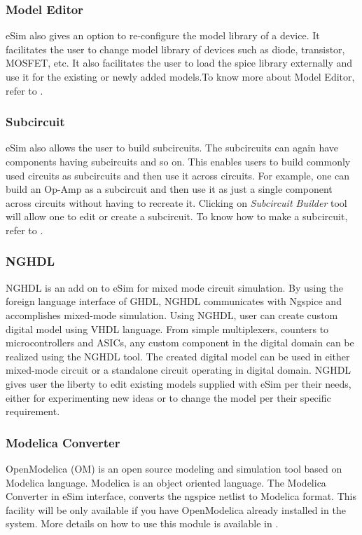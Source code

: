 \subsubsection {Model Editor}
eSim also gives an option to re-configure the model library of a
device. It facilitates the user to change model library of devices
such as diode, transistor, MOSFET, etc. It also facilitates the user to load the spice library externally and use it for the existing or newly added models.To know
more about Model Editor, refer to .

\subsubsection {Subcircuit}
eSim also allows the user to build subcircuits. The subcircuits can
again have components having subcircuits and so on. This enables users
to build commonly used circuits as subcircuits and then use it across
circuits. For example, one can build an Op-Amp as a
subcircuit and then use it as just a single component across circuits
without having to recreate it. Clicking on \textit{Subcircuit
Builder} tool will allow one to edit or create a subcircuit. To know
how to make a subcircuit, refer to .

\subsubsection {NGHDL}
NGHDL is an add on to eSim for mixed mode circuit simulation. By using the foreign language interface of GHDL, NGHDL communicates with Ngspice and accomplishes mixed-mode simulation. Using NGHDL, user can create custom digital model using VHDL language. From simple multiplexers, counters to microcontrollers and ASICs, any custom component in the digital domain can be realized using the NGHDL tool. The created digital model can be used in either mixed-mode circuit or a standalone circuit operating in digital domain. NGHDL gives user the liberty to edit existing models supplied with eSim per their needs, either for experimenting new ideas or to change the model per their specific requirement.

\subsubsection {Modelica Converter}
OpenModelica (OM) is an open source modeling and simulation tool based on
Modelica language. Modelica is an object oriented language. The Modelica Converter in eSim interface, converts the ngspice netlist to Modelica format. This facility will be only available if you have OpenModelica already installed in the system. More details on how to use this module is available in .

